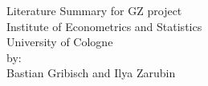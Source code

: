 

\begin{titlepage}

\thispagestyle{empty}   %


\begin{center}
\vspace*{2.cm}
{\textbf  \Large Literature Summary for GZ project} \\
\vspace*{2cm}
\vspace{0.5cm}
Institute of Econometrics and Statistics\\
University of Cologne\\
\vspace*{0.5cm}
by:\\
Bastian Gribisch and Ilya Zarubin\\
\vspace*{0.5cm}

\end{center}




\end{titlepage}

